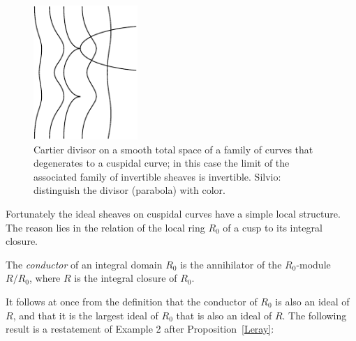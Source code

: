 \begin{figure}
\centerline {\includegraphics[height=2in]{"main/Fig13-1"}}
\caption{Cartier divisor on a smooth total space of a family of curves that degenerates to a cuspidal curve; in this case the
limit of the associated family of invertible sheaves is invertible. {Silvio: distinguish the divisor
(parabola) with color.}}
\label{Fig13.1}
\end{figure}

%

Fortunately the ideal sheaves on cuspidal curves have a simple local structure. The reason lies in the relation of the local ring $R_{0}$ of a cusp to its integral closure. 

\begin{definition}
The \emph{conductor} of an integral domain $R_{0}$ is the annihilator of the $R_{0}$-module
$R/R_{0}$, where $R$ is the integral closure of $R_{0}$.
\end{definition}

It follows at once from the definition that the conductor of $R_{0}$ is also an ideal of $R$, and that it is the largest ideal of $R_{0}$ that is also
an ideal of $R$. The following result is a restatement of Example 2 after Proposition~\ref{Leray}:

